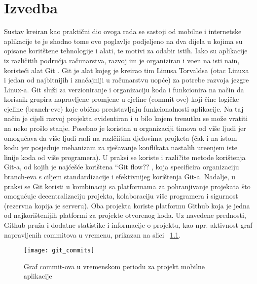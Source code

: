 \chapter{Izvedba}

Sustav kreiran kao prakti\v{c}ni dio ovoga rada se sastoji od mobilne i internetske aplikacije te je shodno tome ovo poglavlje podjeljeno na dva dijela u kojima su opisane korit\v{s}tene tehnologije i alati, te motivi za odabir istih. Iako su aplikacije iz razli\v{c}itih podru\v{c}ja ra\v{c}unarstva, razvoj im je organiziran i vo\dj en na isti nain, koriste\'{c}i alat Git \cite{git}. Git je alat kojeg je kreirao tim Linusa Torvaldsa (otac Linuxa i jedan od najbitnijih i zna\v{c}ajniji u ra\v{c}unarstvu uop\'{c}e) za potrebe razvoja jezgre Linux-a. Git slu\v{z}i za verzioniranje i organizaciju koda i funkcionira na na\v{c}in da korisnik grupira napravljene promjene u cjeline (commit-ove) koji \v{c}ine logi\v{c}ke cjeline (branch-eve) koje obi\v{c}no predstavljaju funkcionalnosti aplikacije. Na taj na\v{c}in je cijeli razvoj projekta evidentiran i u bilo kojem trenutku se mo\v{z}e vratiti na neko pro\v{s}lo stanje. Posebno je koristan u organizaciji timova od vi\v{s}e ljudi jer omogu\'{c}ava da vi\v{s}e ljudi radi na razl\v{c}iitim djelovima projketa (\v{c}ak i na istom kodu jer posjeduje mehanizam za rje\v{s}avanje konflikata nastalih ure\dj enjem iste linije koda od vi\v{s}e programera). U praksi se koriste i razli?ite metode kori\v{s}tenja Git-a, od kojih je naj\'{c}e\v{s}\'{c}e kori\v{s}tena ``Git flow?? \cite{git_flow}, koja specificira organizaciju branch-eva s ciljem standardizacije i efektivnijeg kori\v{s}tenja Git-a. Nadalje, u praksi se Git koristi u kombinaciji sa platformama za pohranjivanje projekata \v{s}to omogu\'{c}uje decentralizaciju projekta, kolaboraciju vi\v{s}e programera i sigurnost (rezervna kopija je serveru). Oba projekta koriste platformu Github \cite{github} koja je jedna od najkori\v{s}tenijih platformi za projekte otvorenog koda. Uz navedene prednosti, Github pru\v{z}a i dodatne statistike i informacije o projektu, kao npr. aktivnost graf napravljenih commitova u vremenu, prikazan na slici  ~\ref{fig:commits}.

\begin{figure}[!htbp]
	\begin{center}
 \texttt{[image: git\_commits]}
 \caption{Graf commit-ova u vremenskom periodu za projekt mobilne aplikacije}
 \label{fig:commits}
	\end{center}
\end{figure}

